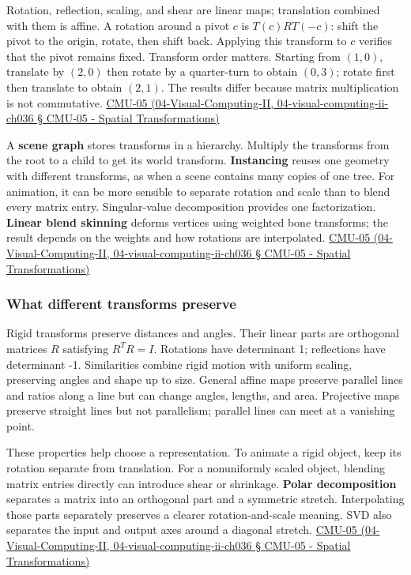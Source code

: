 Rotation, reflection, scaling, and shear are linear maps; translation combined with them is affine. A rotation around a pivot \(c\) is \(T(c)RT(-c)\): shift the pivot to the origin, rotate, then shift back. Applying this transform to \(c\) verifies that the pivot remains fixed. Transform order matters. Starting from \((1,0)\), translate by \((2,0)\) then rotate by a quarter-turn to obtain \((0,3)\); rotate first then translate to obtain \((2,1)\). The results differ because matrix multiplication is not commutative. \href{}{CMU-05 (04-Visual-Computing-II, 04-visual-computing-ii-ch036 § CMU-05 - Spatial Transformations)}

A \textbf{scene graph} stores transforms in a hierarchy. Multiply the transforms from the root to a child to get its world transform. \textbf{Instancing} reuses one geometry with different transforms, as when a scene contains many copies of one tree. For animation, it can be more sensible to separate rotation and scale than to blend every matrix entry. Singular-value decomposition provides one factorization. \textbf{Linear blend skinning} deforms vertices using weighted bone transforms; the result depends on the weights and how rotations are interpolated. \href{}{CMU-05 (04-Visual-Computing-II, 04-visual-computing-ii-ch036 § CMU-05 - Spatial Transformations)}

\subsubsection{What different transforms preserve}\label{what-different-transforms-preserve}

Rigid transforms preserve distances and angles. Their linear parts are orthogonal matrices \(R\) satisfying \(R^TR=I\). Rotations have determinant 1; reflections have determinant -1. Similarities combine rigid motion with uniform scaling, preserving angles and shape up to size. General affine maps preserve parallel lines and ratios along a line but can change angles, lengths, and area. Projective maps preserve straight lines but not parallelism; parallel lines can meet at a vanishing point.

These properties help choose a representation. To animate a rigid object, keep its rotation separate from translation. For a nonuniformly scaled object, blending matrix entries directly can introduce shear or shrinkage. \textbf{Polar decomposition} separates a matrix into an orthogonal part and a symmetric stretch. Interpolating those parts separately preserves a clearer rotation-and-scale meaning. SVD also separates the input and output axes around a diagonal stretch. \href{}{CMU-05 (04-Visual-Computing-II, 04-visual-computing-ii-ch036 § CMU-05 - Spatial Transformations)}

